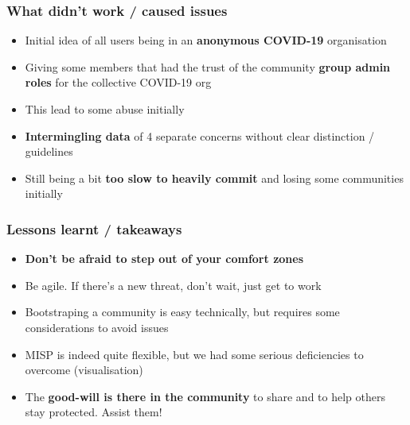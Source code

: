 \begin{frame}
 \frametitle{What didn't work / caused issues}
 \begin{itemize}
         \item Initial idea of all users being in an {\bf anonymous COVID-19} organisation
         \item Giving some members that had the trust of the community {\bf group admin roles} for the collective COVID-19 org
         \item This lead to some abuse initially
         \item {\bf Intermingling data} of 4 separate concerns without clear distinction / guidelines
         \item Still being a bit {\bf too slow to heavily commit} and losing some communities initially
 \end{itemize}
\end{frame}

\begin{frame}
 \frametitle{Lessons learnt / takeaways}
 \begin{itemize}
         \item {\bf Don't be afraid to step out of your comfort zones}
         \item Be agile. If there's a new threat, don't wait, just get to work
         \item Bootstraping a community is easy technically, but requires some considerations to avoid issues
         \item MISP is indeed quite flexible, but we had some serious deficiencies to overcome (visualisation)
         \item The {\bf good-will is there in the community} to share and to help others stay protected. Assist them!
 \end{itemize}
\end{frame}


